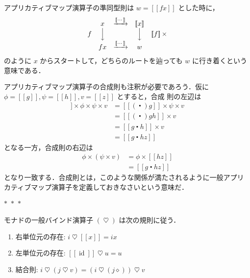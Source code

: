 \documentclass[a5paper,twoside,fleqn,draft]{jsbook}
\def\[{[\![}
\def\]{]\!]}
\newcommand{\separator}{\begin{center}$*$~$*$~$*$\end{center}}
\newcommand{\mAnonParam}{\diamond}
\newcommand{\mSpecialFunc}[1]{#1}
\DeclareMathOperator{\mId}{\mSpecialFunc{id}}
\DeclareMathOperator{\mAppMap}{\times}
\DeclareMathOperator{\mBind}{\heartsuit}
\DeclareMathOperator{\mBindComp}{\maltese}
\DeclareMathOperator{\mComp}{\centerdot}
\newcommand{\mPureWith}[1]{\[#1\]}
\begin{document}
アプリカティブマップ演算子の準同型則は $w=\mPureWith{fx}$ とした時に，
\begin{equation}
\begin{matrix}
&x&\xrightarrow{\mPureWith{\dotsb}}&\mPureWith{x}\\
f&\Big\downarrow&&\Big\downarrow&\mPureWith{f}\mAppMap\\
&fx&\xrightarrow{\mPureWith{\dotsb}}&w
\end{matrix}
\end{equation}
のように $x$ からスタートして，どちらのルートを辿っても $w$ に行き着くという意味である．

アプリカティブマップ演算子の合成則も注釈が必要であろう．仮に
$\phi=\mPureWith{g},\psi=\mPureWith{h},v=\mPureWith{z}$ とすると，合成
則の左辺は
\begin{align}
\mPureWith{(\mComp)}\mAppMap\phi\mAppMap\psi\mAppMap v
&=\mPureWith{(\mComp)g}\mAppMap\psi\mAppMap v\\
&=\mPureWith{(\mComp)gh}\mAppMap v\\
&=\mPureWith{g\mComp h}\mAppMap v\\
&=\mPureWith{g\mComp hz}
\end{align}
となる一方，合成則の右辺は
\begin{align}
\phi\mAppMap{}(\psi\mAppMap v)
&=\phi\mAppMap\mPureWith{hz}\\
&=\mPureWith{g\mComp hz}
\end{align}
となり一致する．合成則とは，このような関係が満たされるように一般アプリ
カティブマップ演算子を定義しておきなさいという意味だ．

\separator

モナドの一般バインド演算子 $(\mBind)$ は次の規則に従う．
\begin{enumerate}
\item 右単位元の存在: $i\mBind{}\mPureWith{x}=ix$
\item 左単位元の存在: $\mPureWith{\mId}\mBind u=u$
\item 結合則: $i\mBind{}(j\mBind v)=(i\mBind{}(j\mAnonParam))\mBind v$
\end{enumerate}
\end{document}
